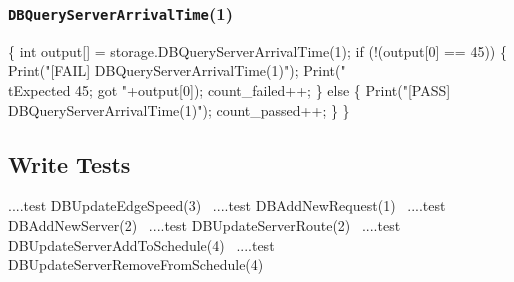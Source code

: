 \documentclass{article}
\def\nwendcode{\endtrivlist \endgroup}
\let\nwdocspar=\par
\theoremstyle{definition}
\begin{document}
\subsubsection{{\tt{}DBQueryServerArrivalTime}(1)}
\nwenddocs{}\endmoddef{}
\{
  int output[] = storage.DBQueryServerArrivalTime(1);
  if (!(output[0] == 45)) \{
    Print("[FAIL] DBQueryServerArrivalTime(1)");
    Print("\\tExpected 45; got "+output[0]);
    count_failed++;
  \} else \{
    Print("[PASS] DBQueryServerArrivalTime(1)");
    count_passed++;
  \}
\}
\nwendcode{}\nwdocspar

\subsection{Write Tests}
\label{sec:write-tests}
\nwenddocs{}\endmoddef{}
\LA{}....test \code{}DBUpdateEdgeSpeed\edoc{}(3)~{\nwtagstyle{}}\RA{}
\LA{}....test \code{}DBAddNewRequest\edoc{}(1)~{\nwtagstyle{}}\RA{}
\LA{}....test \code{}DBAddNewServer\edoc{}(2)~{\nwtagstyle{}}\RA{}
\LA{}....test \code{}DBUpdateServerRoute\edoc{}(2)~{\nwtagstyle{}}\RA{}
\LA{}....test \code{}DBUpdateServerAddToSchedule\edoc{}(4)~{\nwtagstyle{}}\RA{}
\LA{}....test \code{}DBUpdateServerRemoveFromSchedule\edoc{}(4)~{\nwtagstyle{}}\RA{}
\nwendcode{}\nwdocspar
\end{document}
